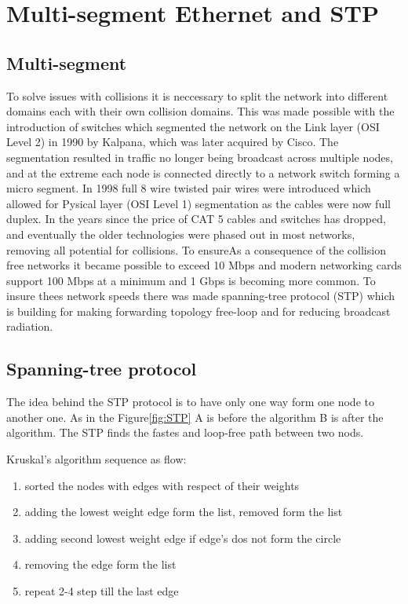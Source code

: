 \section{Multi-segment Ethernet and STP}
\subsection{Multi-segment}

To solve issues with collisions it is neccessary to split the network into different domains each with their own collision domains. This was made possible with the introduction of switches which segmented the network on the Link layer (OSI Level 2) in 1990 by Kalpana, which was later acquired by Cisco. The segmentation resulted in traffic no longer being broadcast across multiple nodes, and at the extreme each node is connected directly to a network switch forming a micro segment. In 1998 full 8 wire twisted pair wires were introduced which allowed for Pysical layer (OSI Level 1) segmentation as the cables were now full duplex. In the years since the price of CAT 5 cables and switches has dropped, and eventually the older technologies were phased out in most networks, removing all potential for collisions. To ensureAs a consequence of the collision free networks it became possible to exceed 10 Mbps and modern networking cards support 100 Mbps at a minimum and 1 Gbps is becoming more common. To insure thees network speeds there was made spanning-tree protocol (STP) which is building for making forwarding topology free-loop and for reducing broadcast radiation. 

\subsection{Spanning-tree protocol}
The idea behind the STP protocol is to have only one way form one node to another one. As in the Figure\ref{fig:STP} A is before the algorithm B is after the algorithm. The STP finds the fastes and loop-free path between two nods.

Kruskal's algorithm sequence as flow:

\begin{enumerate}
	\item sorted the nodes with edges with respect of their weights
	\item adding the lowest weight edge form the list, removed form the list 	
	\item adding second lowest weight edge if edge's dos not form the circle
	\item removing the edge form the list  
	\item repeat 2-4 step till the last edge  
\end{enumerate}

